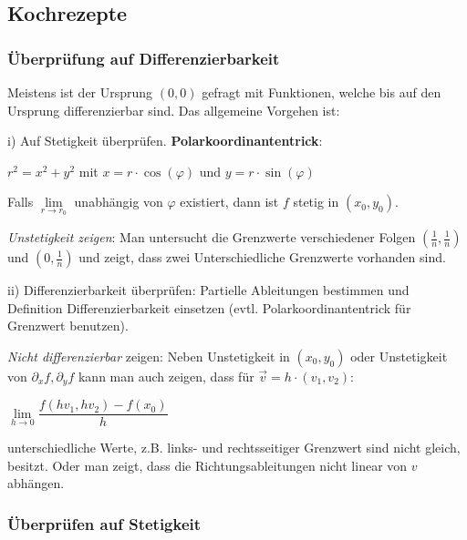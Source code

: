 \begin{multicols*}{3}
    \subsection{Kochrezepte}

    \subsubsection{Überprüfung auf Differenzierbarkeit}

    Meistens ist der Ursprung $(0,0)$ gefragt mit Funktionen, welche bis auf den Ursprung differenzierbar sind. Das allgemeine Vorgehen ist: \medskip

    i) Auf Stetigkeit überprüfen. \textbf{Polarkoordinantentrick}:

    \begin{center}
        $r^2 = x^2+y^2$ mit $x = r \cdot \cos(\varphi)$ und $y = r \cdot \sin(\varphi)$
    \end{center}
    \medskip

    Falls $\lim\limits_{r \to r_0}$ unabhängig von $\varphi$ existiert, dann ist $f$ stetig in $(x_0,y_0)$. \medskip

    \emph{Unstetigkeit zeigen}: Man untersucht die Grenzwerte verschiedener Folgen $(\frac{1}{n},\frac{1}{n})$ und $(0,\frac{1}{n})$ und zeigt, dass zwei Unterschiedliche Grenzwerte vorhanden sind. \medskip

    ii) Differenzierbarkeit überprüfen: Partielle Ableitungen bestimmen und Definition Differenzierbarkeit einsetzen (evtl. Polarkoordinantentrick für Grenzwert benutzen). \medskip

    \emph{Nicht differenzierbar} zeigen: Neben Unstetigkeit in $(x_0,y_0)$ oder Unstetigkeit von $\partial_x f, \partial_y f$ kann man auch zeigen, dass für $\vec{v} = h\cdot(v_1,v_2)$:

    \begin{center}
        $\lim\limits_{h\to 0} \dfrac{f(h v_1,h v_2)-f(x_0)}{h}$
    \end{center}

    unterschiedliche Werte, z.B. links- und rechtsseitiger Grenzwert sind nicht gleich, besitzt. Oder man zeigt, dass die Richtungsableitungen nicht linear von $v$ abhängen.


    \subsubsection{Überprüfen auf Stetigkeit}


\end{multicols*}
